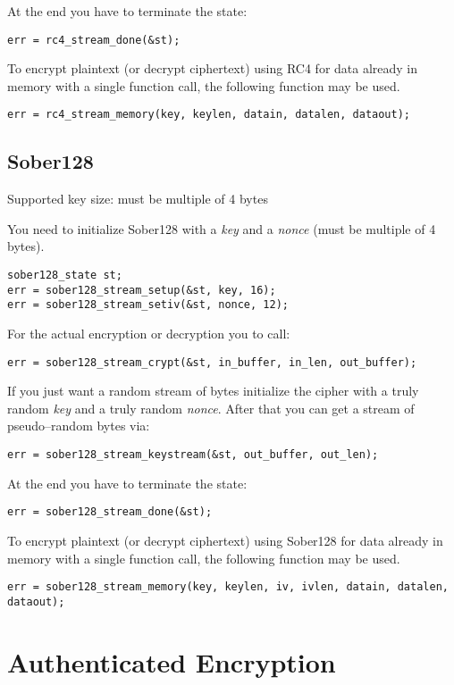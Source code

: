 \documentclass[synpaper]{book}
\newcommand{\mysection}[1]    %
	{                   %
	\section{#1}
   \markboth{\textsf{www.libtom.net}}{\thesection ~ {#1}}
	}
\begin{document}
At the end you have to terminate the state:
\begin{verbatim}
err = rc4_stream_done(&st);
\end{verbatim}

To encrypt plaintext (or decrypt ciphertext) using RC4 for data already in
memory with a single function call, the following function may be used.
\begin{verbatim}
err = rc4_stream_memory(key, keylen, datain, datalen, dataout);
\end{verbatim}

\mysection{Sober128}

Supported key size: must be multiple of 4 bytes

You need to initialize Sober128 with a \textit{key} and a \textit{nonce} (must be multiple of 4 bytes).
\begin{verbatim}
sober128_state st;
err = sober128_stream_setup(&st, key, 16);
err = sober128_stream_setiv(&st, nonce, 12);
\end{verbatim}

For the actual encryption or decryption you to call:
\begin{verbatim}
err = sober128_stream_crypt(&st, in_buffer, in_len, out_buffer);
\end{verbatim}

If you just want a random stream of bytes initialize the cipher with a truly random \textit{key}
and a truly random \textit{nonce}. After that you can get a stream of pseudo--random bytes via:
\begin{verbatim}
err = sober128_stream_keystream(&st, out_buffer, out_len);
\end{verbatim}

At the end you have to terminate the state:
\begin{verbatim}
err = sober128_stream_done(&st);
\end{verbatim}

To encrypt plaintext (or decrypt ciphertext) using Sober128 for data already in
memory with a single function call, the following function may be used.
\begin{verbatim}
err = sober128_stream_memory(key, keylen, iv, ivlen, datain, datalen, dataout);
\end{verbatim}

\chapter{Authenticated Encryption}
\end{document}
